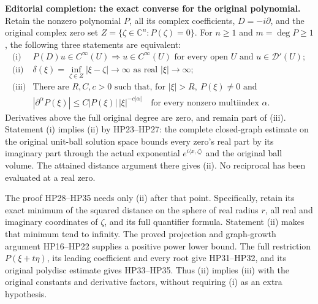 \documentclass[
  11pt,
]{article}
\begin{document}
\textbf{Editorial completion: the exact converse for the original
polynomial.} Retain the nonzero polynomial \(P\), all its complex
coefficients, \(D=-i\partial\), and the original complex zero set
\(Z=\{\zeta\in\mathbb C^n:P(\zeta)=0\}\). For \(n\ge1\) and
\(m=\deg P\ge1\), the following three statements are equivalent: \[
\begin{array}{ll}
\text{(i)}&P(D)u\in C^\infty(U)\Longrightarrow u\in C^\infty(U)
       \text{ for every open }U\text{ and }u\in\mathcal D'(U);\\
\text{(ii)}&\delta(\xi)=\inf_{\zeta\in Z}|\xi-\zeta|\longrightarrow\infty
       \text{ as real }|\xi|\longrightarrow\infty;\\
\text{(iii)}&\text{There are }R,C,c>0\text{ such that, for }|\xi|>R,\ P(\xi)\ne0\text{ and}\\
&|\partial^\alpha P(\xi)|\le C|P(\xi)|\,|\xi|^{-c|\alpha|}
       \quad\text{for every nonzero multiindex }\alpha.
\end{array}
\tag{HC1}
\] Derivatives above the full original degree are zero, and remain part
of (iii). Statement (i) implies (ii) by HP23--HP27: the complete
closed-graph estimate on the original unit-ball solution space bounds
every zero's real part by its imaginary part through the actual
exponential \(e^{i\langle x,\zeta\rangle}\) and the original ball
volume. The attained distance argument there gives (ii). No reciprocal
has been evaluated at a real zero.

The proof HP28--HP35 needs only (ii) after that point. Specifically,
retain its exact minimum of the squared distance on the sphere of real
radius \(r\), all real and imaginary coordinates of \(\zeta\), and its
full quantifier formula. Statement (ii) makes that minimum tend to
infinity. The proved projection and graph-growth argument HP16--HP22
supplies a positive power lower bound. The full restriction
\(P(\xi+t\eta)\), its leading coefficient and every root give
HP31--HP32, and its original polydisc estimate gives HP33--HP35. Thus
(ii) implies (iii) with the original constants and derivative factors,
without requiring (i) as an extra hypothesis.
\end{document}
